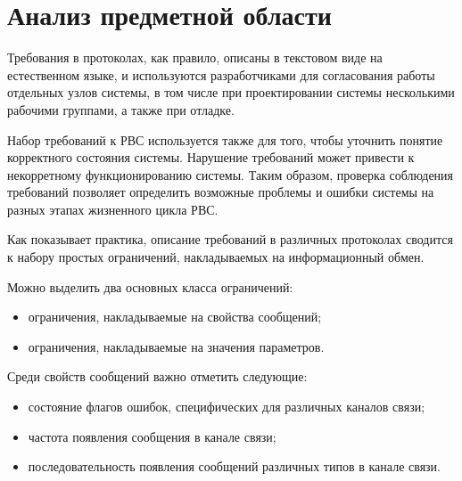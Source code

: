 \section{Анализ предметной области}

\iffalse

Тезисы:

0. В разных протоколах написаны примерно одинаковые вещи =>
1. Требования нужно разбивать на простые, и это будет универсально и удобно.
2. Список требований как результат изучения протоколов и обсуждения с 
разработчиками и тестерами РВС.
3. Замечание о том, что в данной работе мы работаем с МКИО, но подразумевается 
расширение и на другие каналы связи.

\fi

Требования в протоколах, как правило, описаны в текстовом виде на естественном 
языке, и используются разработчиками для согласования работы отдельных узлов 
системы, в том числе при проектировании системы несколькими рабочими группами, 
а также при отладке.

Набор требований к РВС используется также для того, чтобы уточнить понятие 
корректного состояния системы. Нарушение требований может привести к 
некорретному функционированию системы. Таким образом, проверка соблюдения 
требований позволяет определить возможные проблемы и ошибки системы на разных 
этапах жизненного цикла РВС.

Как показывает практика, описание требований в различных протоколах сводится к 
набору простых ограничений, накладываемых на информационный обмен. 

Можно выделить два основных класса ограничений:

\begin{itemize}
 \item ограничения, накладываемые на свойства сообщений;
 \item ограничения, накладываемые на значения параметров.
\end{itemize}

Среди свойств сообщений важно отметить следующие:

\begin{itemize}
 \item состояние флагов ошибок, специфических для различных каналов связи;
 \item частота появления сообщения в канале связи;
 \item последовательность появления сообщений различных типов в канале связи.
\end{itemize}

